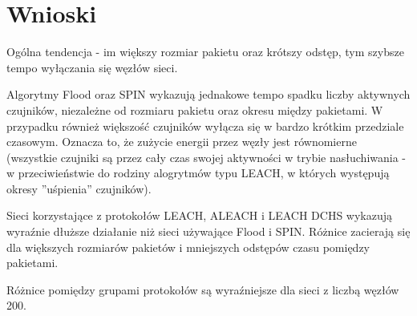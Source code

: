 \chapter{Wnioski}

Ogólna tendencja - im większy rozmiar pakietu oraz krótszy odstęp, tym  szybsze tempo wyłączania się węzłów sieci.

Algorytmy Flood oraz SPIN wykazują jednakowe tempo spadku liczby aktywnych czujników, niezależne od rozmiaru pakietu oraz okresu między pakietami. W przypadku również większość czujników wyłącza się w bardzo krótkim przedziale czasowym. Oznacza to, że zużycie energii przez węzły jest równomierne (wszystkie czujniki są przez cały czas swojej aktywności w trybie nasłuchiwania - w przeciwieństwie do rodziny alogrytmów typu LEACH, w których występują okresy ''uśpienia'' czujników).

Sieci korzystające z protokołów LEACH, ALEACH i LEACH DCHS wykazują wyraźnie dłuższe działanie niż sieci używające Flood i SPIN.
Różnice zacierają się dla większych rozmiarów pakietów i mniejszych odstępów czasu pomiędzy pakietami.

Różnice pomiędzy grupami protokołów są wyraźniejsze dla sieci z liczbą węzłów 200.
